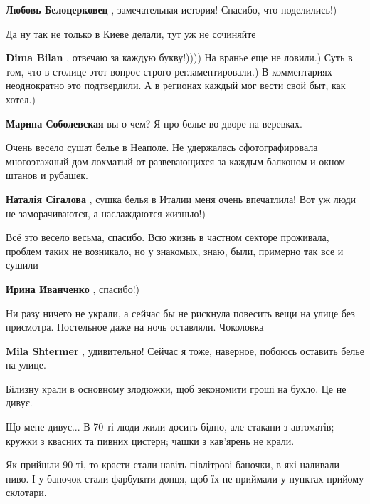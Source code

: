 \begin{itemize}
\textbf{Любовь Белоцерковец} , замечательная история! Спасибо, что поделились!)

Да ну так не только в Киеве делали, тут уж не сочиняйте

\begin{itemize} %
\textbf{Dima Bilan} , отвечаю за каждую букву!)))) На вранье еще не ловили.) Суть в том, что в столице этот вопрос строго регламентировали.) В комментариях неоднократно это подтвердили. А в регионах каждый мог вести свой быт, как хотел.)

\textbf{Марина Соболевская} вы о чем? Я про белье во дворе на веревках.
\end{itemize} %


Очень весело сушат белье в Неаполе. Не удержалась сфотографировала многоэтажный
дом лохматый от развевающихся за каждым балконом и окном штанов и рубашек.

\textbf{Наталія Сігалова} , сушка белья в Италии меня очень впечатлила! Вот уж люди не заморачиваются, а наслаждаются жизнью!)


Всё это весело весьма, спасибо.
Всю жизнь в частном секторе проживала, проблем таких не возникало, но у
знакомых, знаю, были, примерно так все и сушили

\textbf{Ирина Иванченко} , спасибо!)


Ни разу ничего не украли, а сейчас бы не рискнула повесить вещи на улице без
присмотра. Постельное даже на ночь оставляли. Чоколовка


\textbf{Mila Shtermer} , удивительно! Сейчас я тоже, наверное, побоюсь оставить белье на улице.


Білизну крали в основному злодюжки, щоб зекономити гроші на бухло. Це не дивує.

Що мене дивує... В 70-ті люди жили досить бідно, але стакани з автоматів;
кружки з квасних та пивних цистерн; чашки з кав'ярень не крали.

Як прийшли 90-ті, то красти стали навіть півлітрові баночки, в які наливали
пиво. І у баночок стали фарбувати донця, щоб їх не приймали у пунктах прийому
склотари.


\end{itemize}
